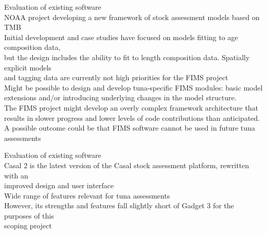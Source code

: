 \documentclass[aspectratio=169,fleqn]{beamer}
\begin{document}

\begin{frame}{Evaluation of existing software}\small
  \\[2ex]
  NOAA project developing a new framework of stock assessment models based on
  TMB\\[2.5ex]
  Initial development and case studies have focused on models fitting to age
  composition data,\\
  but the design includes the ability to fit to length composition data.
  Spatially explicit models\\
  and tagging data are currently not high priorities for the FIMS project\\[2.5ex]
  Might be possible to design and develop tuna-specific FIMS modules: basic
  model extensions and/or introducing underlying changes in the model
  structure.\\[2.5ex]
  The FIMS project might develop an overly complex framework architecture that
  results in slower progress and lower levels of code contributions than
  anticipated. A possible outcome could be that FIMS software cannot be used in
  future tuna assessments\\[8ex]
\end{frame}


\begin{frame}{Evaluation of existing software}\small
  \\[2ex]
  Casal 2 is the latest version of the Casal stock assessment platform,
  rewritten with an\\
  improved design and user interface\\[2.5ex]
  Wide range of features relevant for tuna assessments\\[2.5ex]
  However, its strengths and features fall slightly short of Gadget 3 for the
  purposes of this\\
  scoping project\\[20ex]
\end{frame}

\end{document}
